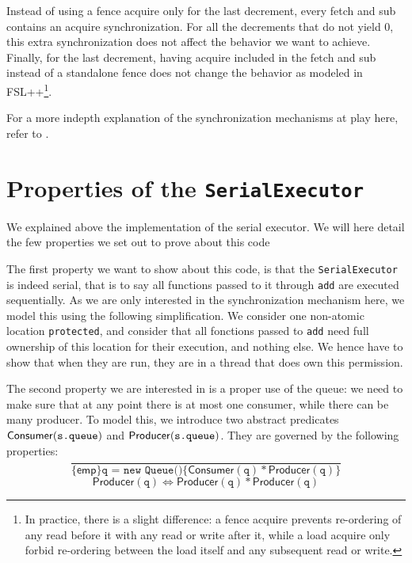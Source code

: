 Instead of using a fence acquire only for the last decrement, every fetch and sub contains an acquire synchronization. For all the decrements that do not yield 0, this extra synchronization does not affect the behavior we want to achieve. Finally, for the last decrement, having acquire included in the fetch and sub instead of a standalone fence does not change the behavior as modeled in FSL++\footnote{In practice, there is a slight difference: a fence acquire prevents re-ordering of any read before it with any read or write after it, while a load acquire only forbid re-ordering between the load itself and any subsequent read or write.}.

For a more indepth explanation of the synchronization mechanisms at play here, refer to \cite{fsl}.


\section{Properties of the \texttt{SerialExecutor}}
We explained above the implementation of the serial executor. We will here detail the few properties we set out to prove about this code

The first property we want to show about this code, is that the \texttt{SerialExecutor} is indeed serial, that is to say all functions passed to it through \texttt{add} are executed sequentially. As we are only interested in the synchronization mechanism here, we model this using the following simplification. We consider one non-atomic location \texttt{protected}, and consider that all fonctions passed to \texttt{add} need full ownership of this location for their execution, and nothing else. We hence have to show that when they are run, they are in a thread that does own this permission.

The second property we are interested in is a proper use of the queue: we need to make sure that at any point there is at most one consumer, while there can be many producer. To model this, we introduce two abstract predicates $\mathsf{Consumer}(\texttt{s.queue})$ and $\mathsf{Producer}(\texttt{s.queue})$. They are governed by the following properties:
\begin{equation}
		\frac{}{\{\mathsf{emp}\} \texttt{q = new Queue()} \{\mathsf{Consumer}(\texttt{q}) * \mathsf{Producer}(\texttt{q})\}} 
		\tag{new queue} 
		\label{eq:nQ}
\end{equation}
\begin{equation}
		\mathsf{Producer}(\texttt{q}) \iff \mathsf{Producer}(\texttt{q}) * \mathsf{Producer}(\texttt{q})
		\tag{producer duplication} 
		\label{eq:prodDup}
\end{equation}

